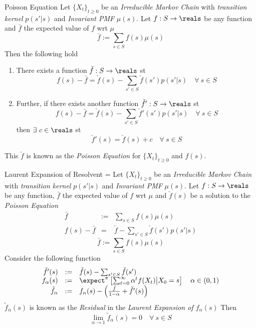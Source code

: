 \documentclass[11pt,a4paper]{article}
\begin{document}
  \begin{theorem}{Poisson Equation}
    Let $\{X_t\}_{t\geq0}$ be an \textit{Irreducible Markov Chain} with \textit{transition kernel} $p(s'|s)$ and \textit{Invariant PMF} $\mu(s)$. Let $f:S\to\reals$ be any function and $\bar{f}$ the expected value of $f$ wrt $\mu$
    \[ \bar{f}:=\sum_{s\in S}f(s)\mu(s) \]
    Then the following hold
    \begin{enumerate}
      \item There exists a function $\check{f}:S\to\reals$ st
      \[ f(s)-\bar{f}=\check{f}(s)-\sum_{s'\in S}\check{f}(s')p(s'|s)\quad\forall\ s\in S \]
      \item Further, if there exists another function $\check{f}':S\to\reals$ st
      \[ f(s)-\bar{f}=\check{f}(s)-\sum_{s'\in S}\check{f}'(s')p(s'|s)\quad\forall\ s\in S \]
      then $\exists\ c\in\reals$ st
      \[ \check{f}'(s)=\check{f}(s)+c\quad\forall\ s\in S \]
    \end{enumerate}
    This $\check{f}$ is known as the \textit{Poisson Equation} for $\{X_t\}_{t\geq0}$ and $f(s)$.
  \end{theorem}

  \begin{theorem}{Laurent Expansion of Resolvent}
    \everymath={\displaystyle}
    Let $\{X_t\}_{t\geq0}$ be an \textit{Irreducible Markov Chain} with \textit{transition kernel} $p(s'|s)$ and \textit{Invariant PMF} $\mu(s)$. Let $f:S\to\reals$ be any function, $\bar{f}$ the expected value of $f$ wrt $\mu$ and $\check{f}(s)$ be a solution to the \textit{Poisson Equation}
    \[\begin{array}{rrl}
      \bar{f}&:=&\sum_{s\in S}f(s)\mu(s)\\
      f(s)-\bar{f}&=&\check{f}-\sum_{s'\in S}\check{f}(s')p(s'|s)
    \end{array}\]
    \[ \bar{f}:=\sum_{s\in S}f(s)\mu(s) \]
    Consider the following function
    \[\begin{array}{rcl}
      \check{f}'(s)&:=&\check{f}(s)-\sum_{s'\in S}\check{f}(s')\\
      f_\alpha(s)&:=&\expect^\pi\left[\sum_{t=0}^\infty\alpha^tf(X_t)\big|X_0=s\right]\quad\alpha\in(0,1)\\
      \tilde{f}_\alpha&:=&f_\alpha(s)-\left(\frac{\bar{f}}{1-\alpha}+\check{f}'(s)\right)
    \end{array}\]
    $\tilde{f}_\alpha(s)$ is known as the \textit{Residual} in the \textit{Laurent Expansion of $f_\alpha(s)$}
    Then
    \[ \lim_{\alpha\to1}\tilde{f}_\alpha(s)=0\quad\forall\ s\in S \]
  \end{theorem}
\end{document}
